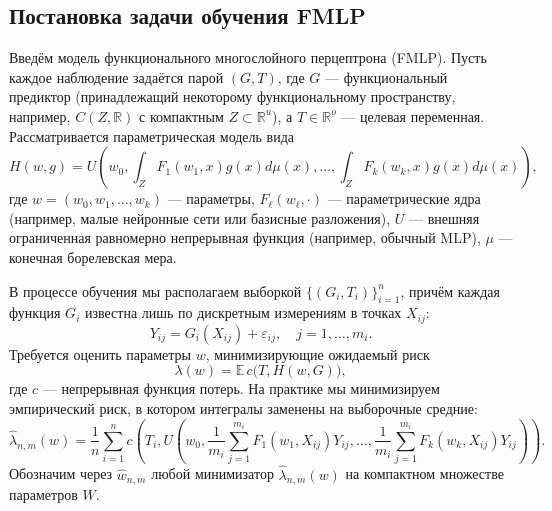 \documentclass[../NDCNNAI_main.tex]{subfiles}
\begin{document}
\subsection{Постановка задачи обучения FMLP}
Введём модель функционального многослойного перцептрона (FMLP). 
Пусть каждое наблюдение задаётся парой $(G, T)$, где $G$ --- функциональный предиктор (принадлежащий некоторому функциональному пространству, например, $C(Z,\mathbb{R})$ с компактным $Z \subset \mathbb{R}^u$), а $T \in \mathbb{R}^o$ --- целевая переменная. 
Рассматривается параметрическая модель вида
\[
H(w, g) = U\!\left(w_0, \int_Z F_1(w_1, x)g(x)d\mu(x), \dots, \int_Z F_k(w_k, x)g(x)d\mu(x)\right),
\]
где $w = (w_0, w_1, \dots, w_k)$ --- параметры, $F_\ell(w_\ell, \cdot)$ --- параметрические ядра (например, малые нейронные сети или базисные разложения), $U$ --- внешняя ограниченная равномерно непрерывная функция (например, обычный MLP), $\mu$ --- конечная борелевская мера.

В процессе обучения мы располагаем выборкой $\{(G_i, T_i)\}_{i=1}^n$, причём каждая функция $G_i$ известна лишь по дискретным измерениям в точках $X_{ij}$:
\[
Y_{ij} = G_i(X_{ij}) + \varepsilon_{ij}, \quad j=1,\dots,m_i.
\]
Требуется оценить параметры $w$, минимизирующие ожидаемый риск
\[
\lambda(w) = \mathbb{E}\, c\bigl(T, H(w, G)\bigr),
\]
где $c$ --- непрерывная функция потерь. 
На практике мы минимизируем эмпирический риск, в котором интегралы заменены на выборочные средние:
\[
\hat{\lambda}_{n,m}(w) = \frac{1}{n}\sum_{i=1}^n c\!\left(T_i, U\!\left(w_0, \frac{1}{m_i}\sum_{j=1}^{m_i} F_1(w_1, X_{ij})Y_{ij}, \dots, \frac{1}{m_i}\sum_{j=1}^{m_i} F_k(w_k, X_{ij})Y_{ij}\right)\right).
\]
Обозначим через $\hat{w}_{n,m}$ любой минимизатор $\hat{\lambda}_{n,m}(w)$ на компактном множестве параметров $W$.
\end{document}
